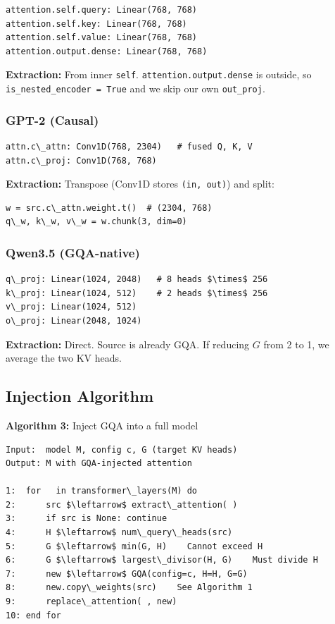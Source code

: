 \begin{lstlisting}
attention.self.query: Linear(768, 768)
attention.self.key: Linear(768, 768)
attention.self.value: Linear(768, 768)
attention.output.dense: Linear(768, 768)
\end{lstlisting}

\textbf{Extraction:} From inner \texttt{self}. \texttt{attention.output.dense} is outside, so 
\texttt{is\_nested\_encoder = True} and we skip our own \texttt{out\_proj}.

\subsubsection{GPT-2 (Causal)}

\begin{lstlisting}
attn.c\_attn: Conv1D(768, 2304)   # fused Q, K, V
attn.c\_proj: Conv1D(768, 768)
\end{lstlisting}

\textbf{Extraction:} Transpose (Conv1D stores \texttt{(in, out)}) and split:

\begin{lstlisting}
w = src.c\_attn.weight.t()  # (2304, 768)
q\_w, k\_w, v\_w = w.chunk(3, dim=0)
\end{lstlisting}

\subsubsection{Qwen3.5 (GQA-native)}

\begin{lstlisting}
q\_proj: Linear(1024, 2048)   # 8 heads $\times$ 256
k\_proj: Linear(1024, 512)    # 2 heads $\times$ 256
v\_proj: Linear(1024, 512)
o\_proj: Linear(2048, 1024)
\end{lstlisting}

\textbf{Extraction:} Direct. Source is already GQA. If reducing $G$ from 2 to 1, 
we average the two KV heads.

\subsection{Injection Algorithm}

\textbf{Algorithm 3:} Inject GQA into a full model
\begin{lstlisting}
Input:  model M, config c, G (target KV heads)
Output: M with GQA-injected attention

1:  for   in transformer\_layers(M) do
2:      src $\leftarrow$ extract\_attention( )
3:      if src is None: continue
4:      H $\leftarrow$ num\_query\_heads(src)
5:      G $\leftarrow$ min(G, H)    Cannot exceed H
6:      G $\leftarrow$ largest\_divisor(H, G)    Must divide H
7:      new $\leftarrow$ GQA(config=c, H=H, G=G)
8:      new.copy\_weights(src)    See Algorithm 1
9:      replace\_attention( , new)
10: end for
\end{lstlisting}


